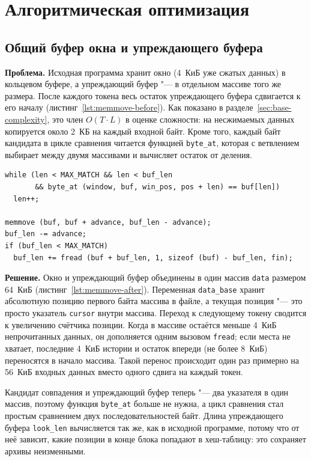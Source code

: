 \chapter{Алгоритмическая оптимизация}
\label{ch:algorithmic}

\section{Общий буфер окна и упреждающего буфера}

\textbf{Проблема.} Исходная программа хранит окно (4~КиБ уже сжатых данных)
в кольцевом буфере, а упреждающий буфер "--- в отдельном массиве того же
размера. После каждого токена весь остаток упреждающего буфера
сдвигается к его началу (листинг~\ref{lst:memmove-before}). Как показано в
разделе~\ref{sec:base-complexity}, это член $O(T \cdot L)$ в оценке
сложности: на несжимаемых данных копируется около 2~КБ на каждый входной
байт. Кроме того, каждый байт кандидата в цикле сравнения читается
функцией \texttt{byte\_at}, которая с ветвлением выбирает между двумя
массивами и вычисляет остаток от деления.

\begin{lstlisting}[caption={Сдвиг упреждающего буфера после каждого токена (исходная программа)},label={lst:memmove-before}]
while (len < MAX_MATCH && len < buf_len
       && byte_at (window, buf, win_pos, pos + len) == buf[len])
  len++;

memmove (buf, buf + advance, buf_len - advance);
buf_len -= advance;
if (buf_len < MAX_MATCH)
  buf_len += fread (buf + buf_len, 1, sizeof (buf) - buf_len, fin);
\end{lstlisting}

\textbf{Решение.} Окно и упреждающий буфер объединены в один массив
\texttt{data} размером 64~КиБ (листинг~\ref{lst:memmove-after}).
Переменная \texttt{data\_base} хранит абсолютную позицию первого байта
массива в файле, а текущая позиция "--- это просто указатель
\texttt{cursor} внутри массива. Переход к следующему токену сводится к
увеличению счётчика позиции. Когда в массиве остаётся меньше 4~КиБ
непрочитанных данных, он дополняется одним вызовом \texttt{fread}; если места
не хватает, последние 4~КиБ истории и остаток впереди (не более 8~КиБ)
переносятся в начало массива. Такой перенос происходит один раз примерно
на 56~КиБ входных данных вместо одного сдвига на каждый токен.

Кандидат совпадения и упреждающий буфер теперь "--- два указателя в один
массив, поэтому функция \texttt{byte\_at} больше не нужна, а цикл
сравнения стал простым сравнением двух последовательностей байт. Длина
упреждающего буфера \texttt{look\_len} вычисляется так же, как в исходной
программе, потому что от неё зависит, какие позиции в конце блока попадают
в хеш-таблицу: это сохраняет архивы неизменными.

